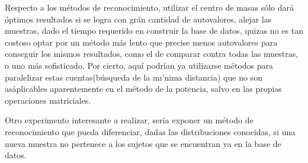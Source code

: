 Respecto a los m\'etodos de reconocimiento, utilizar el centro de masas s\'olo dar\'a \'optimos resultados si se logra con gr\'an cantidad de autovalores, alejar las muestras, dado el tiempo requerido en construir la base de datos, quizas no es tan costoso optar por un m\'etodo m\'as lento que precise menos autovalores para conseguir los mismos resultados, como el de comparar contra todas las muestras, o uno m\'as sofisticado. Por cierto, aqu\'i podr\'ian ya utilizarse m\'etodos para paralelizar estas cuentas(b\'usqueda de la m\i'nima distancia) que no son as\' aplicables aparentemente en el m\'etodo de la potencia, salvo en las propias operaciones matriciales.

Otro experimento interesante a realizar, ser\'ia exponer un m\'etodo de reconocimiento que pueda diferenciar, dadas las distribuciones conocidas, si una nueva muestra no pertenece a los sujetos que se encuentran ya en la base de datos.

